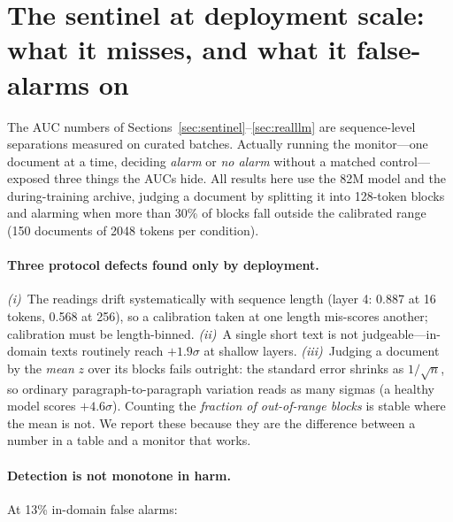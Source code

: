 \documentclass[11pt]{article}
\begin{document}
\section{The sentinel at deployment scale: what it misses, and what it
false-alarms on}
\label{sec:deploy}

The AUC numbers of Sections~\ref{sec:sentinel}--\ref{sec:realllm} are
sequence-level separations measured on curated batches. Actually running the
monitor---one document at a time, deciding \emph{alarm} or \emph{no alarm}
without a matched control---exposed three things the AUCs hide. All results
here use the 82M model and the during-training archive, judging a document by
splitting it into 128-token blocks and alarming when more than 30\% of blocks
fall outside the calibrated range (150 documents of 2048 tokens per condition).

\paragraph{Three protocol defects found only by deployment.} \emph{(i)}~The
readings drift systematically with sequence length (layer 4: 0.887 at 16
tokens, 0.568 at 256), so a calibration taken at one length mis-scores another;
calibration must be length-binned. \emph{(ii)}~A single short text is not
judgeable---in-domain texts routinely reach $+1.9\sigma$ at shallow layers.
\emph{(iii)}~Judging a document by the \emph{mean} $z$ over its blocks fails
outright: the standard error shrinks as $1/\sqrt{n}$, so ordinary
paragraph-to-paragraph variation reads as many sigmas (a healthy model scores
$+4.6\sigma$). Counting the \emph{fraction of out-of-range blocks} is stable
where the mean is not. We report these because they are the difference between
a number in a table and a monitor that works.

\paragraph{Detection is not monotone in harm.} At 13\% in-domain false alarms:
\end{document}
